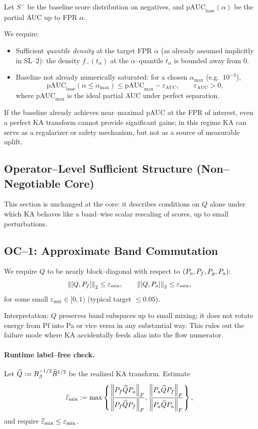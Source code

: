 Let $S^-$ be the baseline score distribution on negatives, and $\text{pAUC}_\text{base}(\alpha)$ be the partial AUC up to FPR $\alpha$.

We require:
\begin{itemize}[nosep]
  \item Sufficient \emph{quantile density} at the target FPR $\alpha$ (as already assumed implicitly in SL--2): the density $f_-(t_\alpha)$ at the $\alpha$--quantile $t_\alpha$ is bounded away from 0.
  \item Baseline not already numerically saturated: for a chosen $\alpha_{\max}$ (e.g.\ $10^{-3}$),
  \[
    \text{pAUC}_\text{base}(\alpha\le \alpha_{\max}) \le \text{pAUC}_{\max} - \varepsilon_{\text{AUC}},\qquad \varepsilon_{\text{AUC}}>0,
  \]
  where $\text{pAUC}_{\max}$ is the ideal partial AUC under perfect separation.
\end{itemize}

If the baseline already achieves near--maximal pAUC at the FPR of interest, even a perfect KA transform cannot provide significant gains; in this regime KA can serve as a regularizer or safety mechanism, but not as a source of measurable uplift.

\subsection{Operator--Level Sufficient Structure (Non--Negotiable Core)}
\label{sec:operator}

This section is unchanged at the core: it describes conditions on $Q$ alone under which KA behaves like a band--wise scalar rescaling of scores, up to small perturbations.

\subsection{OC--1: Approximate Band Commutation}

We require $Q$ to be nearly block--diagonal with respect to $(P_o,P_f,P_g,P_a)$:
\[
\left\lVert [Q,P_f] \right\rVert_2 \le \varepsilon_{\text{mix}},\qquad
\left\lVert [Q,P_a] \right\rVert_2 \le \varepsilon_{\text{mix}},
\]
for some small $\varepsilon_{\text{mix}}\in[0,1)$ (typical target $\le 0.05$).

Interpretation: $Q$ preserves band subspaces up to small mixing; it does not rotate energy from Pf into Pa or vice versa in any substantial way. This rules out the failure mode where KA accidentally feeds alias into the flow numerator.

\paragraph{Runtime label--free check.}
Let $\widehat Q := R_\beta^{-1/2}\widehat R^{1/2}$ be the realized KA transform. Estimate
\[
\widehat\varepsilon_{\text{mix}} :=
\max\left\{ 
  \frac{\left\lVert P_f \widehat Q P_a \right\rVert_F}{\left\lVert P_f \widehat Q P_f \right\rVert_F},
  \frac{\left\lVert P_a \widehat Q P_f \right\rVert_F}{\left\lVert P_a \widehat Q P_a \right\rVert_F}
\right\},
\]
and require $\widehat\varepsilon_{\text{mix}} \le \varepsilon_{\text{mix}}$.

